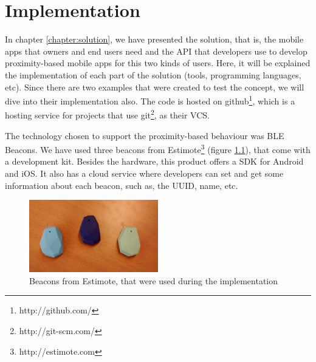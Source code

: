 
\chapter{Implementation}
\label{chapter:implementation}
In chapter \ref{chapter:solution}, we have presented the solution, that is,
the mobile apps that owners and end users need and the API that developers use
to develop proximity-based mobile apps for this two kinds of users.
Here, it will be explained the implementation of each part of the solution
(tools, programming languages, etc). Since there are two examples that were
created to test the concept, we will dive into their implementation also.
The code is hosted on
github\footnote{http://github.com/}, which is a hosting service for projects
that use git\footnote{http://git-scm.com/}, as their \gls{VCS}.

The technology chosen to support the proximity-based behaviour was
\gls{BLE} Beacons.
We have used three beacons from Estimote\footnote{http://estimote.com}
(figure \ref{fig:estimote}), that come with a development kit.
Besides the hardware, this product offers a \gls{SDK} for Android and
iOS. It also has a cloud service where developers can set and get
some information about each beacon, such as, the \gls{UUID}, name, etc.

\begin{figure}[!ht]
  \centering
    \includegraphics[width=0.5\textwidth, keepaspectratio]{images/estimote}
    \caption{Beacons from Estimote, that were used during the implementation}
    \label{fig:estimote}
\end{figure}

